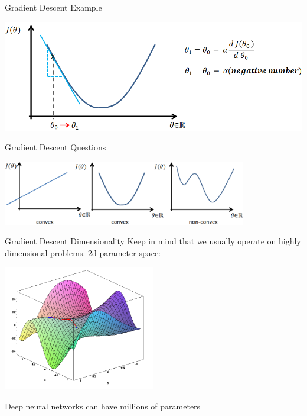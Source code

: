 \documentclass{beamer}
\begin{document}
\begin{frame}{Gradient Descent Example}
\begin{center}
\includegraphics[width=1.1\textwidth]{gd6}
\end{center}
\end{frame}


\begin{frame}{Gradient Descent Questions}
\begin{center}
\includegraphics[width=0.8\textwidth]{convexity}
\end{center}

\begin{itemize}
\end{itemize}
\end{frame}

\begin{frame}{Gradient Descent Dimensionality}
Keep in mind that we usually operate on highly dimensional problems. 2d parameter space:
\begin{center}
\includegraphics[width=0.5\textwidth]{gd_surface}
\end{center} \cite{WikiOverfitting}
Deep neural networks can have millions of parameters
\end{frame}
\end{document}
